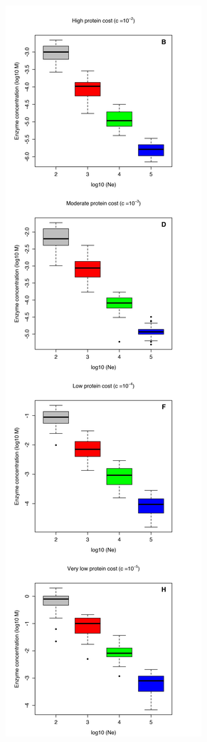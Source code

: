 \begin{figure}[!p]
\begin{center}
\begin{minipage}[c]{0.4\textwidth}
  \includegraphics[scale=0.52,trim=0cm 0cm 0cm 0cm,clip]{pics/SM-Enzymes/Evo_Conc_Results_Cost.jpeg}
  \end{minipage}

\end{center}
\end{figure}

